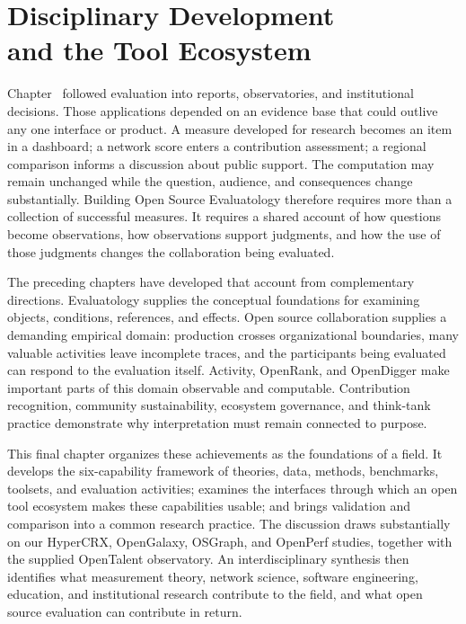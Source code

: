 \chapter[Disciplinary Development and the Tool Ecosystem]{Disciplinary Development\\and the Tool Ecosystem}
\label{ch:discipline}

Chapter~ followed evaluation into reports, observatories, and institutional decisions. Those applications depended on an evidence base that could outlive any one interface or product. A measure developed for research becomes an item in a dashboard; a network score enters a contribution assessment; a regional comparison informs a discussion about public support. The computation may remain unchanged while the question, audience, and consequences change substantially. Building Open Source Evaluatology therefore requires more than a collection of successful measures. It requires a shared account of how questions become observations, how observations support judgments, and how the use of those judgments changes the collaboration being evaluated.

The preceding chapters have developed that account from complementary directions. Evaluatology supplies the conceptual foundations for examining objects, conditions, references, and effects. Open source collaboration supplies a demanding empirical domain: production crosses organizational boundaries, many valuable activities leave incomplete traces, and the participants being evaluated can respond to the evaluation itself. Activity, OpenRank, and OpenDigger make important parts of this domain observable and computable. Contribution recognition, community sustainability, ecosystem governance, and think-tank practice demonstrate why interpretation must remain connected to purpose.

This final chapter organizes these achievements as the foundations of a field. It develops the six-capability framework of theories, data, methods, benchmarks, toolsets, and evaluation activities; examines the interfaces through which an open tool ecosystem makes these capabilities usable; and brings validation and comparison into a common research practice. The discussion draws substantially on our HyperCRX, OpenGalaxy, OSGraph, and OpenPerf studies, together with the supplied OpenTalent observatory. An interdisciplinary synthesis then identifies what measurement theory, network science, software engineering, education, and institutional research contribute to the field, and what open source evaluation can contribute in return.

